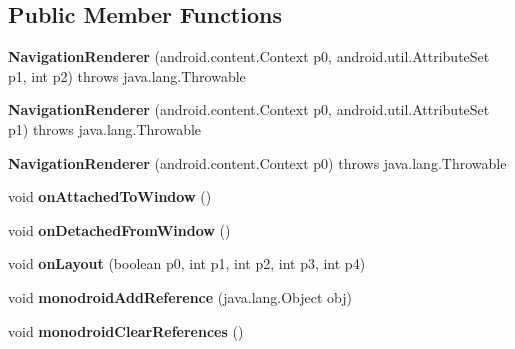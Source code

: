 \subsection*{Public Member Functions}
\begin{DoxyCompactItemize}
\item 
\mbox{\label{classmd5b60ffeb829f638581ab2bb9b1a7f4f3f_1_1NavigationRenderer_a4fd75f7ccc53756baaf34338ee29fa5c}} 
{\bfseries Navigation\+Renderer} (android.\+content.\+Context p0, android.\+util.\+Attribute\+Set p1, int p2)  throws java.\+lang.\+Throwable 	
\item 
\mbox{\label{classmd5b60ffeb829f638581ab2bb9b1a7f4f3f_1_1NavigationRenderer_ae79f4d9083161297dbede7b341873a6c}} 
{\bfseries Navigation\+Renderer} (android.\+content.\+Context p0, android.\+util.\+Attribute\+Set p1)  throws java.\+lang.\+Throwable 	
\item 
\mbox{\label{classmd5b60ffeb829f638581ab2bb9b1a7f4f3f_1_1NavigationRenderer_af6814c5338c0aaf0027c562d0344ddca}} 
{\bfseries Navigation\+Renderer} (android.\+content.\+Context p0)  throws java.\+lang.\+Throwable 	
\item 
\mbox{\label{classmd5b60ffeb829f638581ab2bb9b1a7f4f3f_1_1NavigationRenderer_a25d8c1e5ebe75b28d52ae09ac7bed4f6}} 
void {\bfseries on\+Attached\+To\+Window} ()
\item 
\mbox{\label{classmd5b60ffeb829f638581ab2bb9b1a7f4f3f_1_1NavigationRenderer_ac900a338e48e325dcc118a47937429c9}} 
void {\bfseries on\+Detached\+From\+Window} ()
\item 
\mbox{\label{classmd5b60ffeb829f638581ab2bb9b1a7f4f3f_1_1NavigationRenderer_a7a117ff161f3a6f2d44642c32fba1306}} 
void {\bfseries on\+Layout} (boolean p0, int p1, int p2, int p3, int p4)
\item 
\mbox{\label{classmd5b60ffeb829f638581ab2bb9b1a7f4f3f_1_1NavigationRenderer_a081007f83180dc47c8fc1b19a1b14c29}} 
void {\bfseries monodroid\+Add\+Reference} (java.\+lang.\+Object obj)
\item 
\mbox{\label{classmd5b60ffeb829f638581ab2bb9b1a7f4f3f_1_1NavigationRenderer_a475bdc366c4f2909604d6e217dba8235}} 
void {\bfseries monodroid\+Clear\+References} ()
\end{DoxyCompactItemize}
